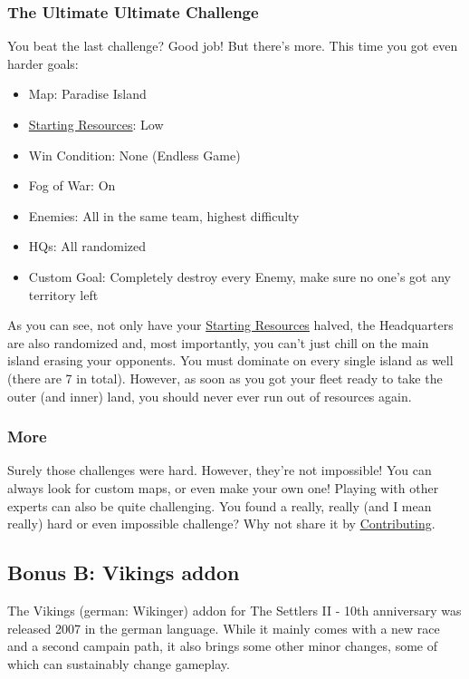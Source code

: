 \documentclass[12pt]{article}
\begin{document}
\subsubsection{The Ultimate Ultimate Challenge}
\label{sec:challenge_ultimate_ultimate}

You beat the last challenge? Good job! But there's more. This time you got even harder goals:

\begin{itemize}
  \item Map: Paradise Island
  \item \hyperref[sec:startingresources]{Starting Resources}: Low
  \item Win Condition: None (Endless Game)
  \item Fog of War: On
  \item Enemies: All in the same team, highest difficulty
  \item HQs: All randomized
  \item Custom Goal: Completely destroy every Enemy, make sure no one's got any territory left
\end{itemize}

As you can see, not only have your \hyperref[sec:startingresources]{Starting Resources} halved, the Headquarters are also randomized and, most importantly, you can't just chill on the main island erasing your opponents. You must dominate on every single island as well (there are 7 in total). However, as soon as you got your fleet ready to take the outer (and inner) land, you should never ever run out of resources again.

\subsubsection{More}
\label{sec:challenge_more}

Surely those challenges were hard. However, they're not impossible! You can always look for custom maps, or even make your own one! Playing with other experts can also be quite challenging. You found a really, really (and I mean really) hard or even impossible challenge? Why not share it by \hyperref[sec:contributing]{Contributing}.

\subsection{Bonus B: Vikings addon}
\label{sec:vikings}

The Vikings (german: Wikinger) addon for The Settlers II - 10th anniversary was released 2007 in the german language. While it mainly comes with a new race and a second campain path, it also brings some other minor changes, some of which can sustainably change gameplay.
\end{document}
